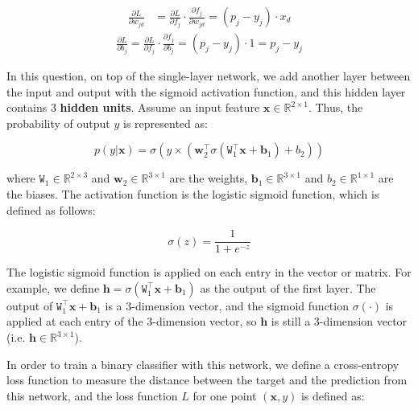 \documentclass{article}
\newcommand{\R}{\mathbb{R}}
\newcommand{\x}{\mathbf{x}}
\newcommand{\w}{\mathbf{w}}
\newcommand{\h}{\mathbf{h}}
\newcommand{\W}{\texttt{W}}
\renewcommand{\b}{\mathbf{b}}
\begin{document}
\begin{probset}
\begin{prob}
\begin{subprobset}
\begin{subprob}
            \begin{soln}
                \begin{align*}
                    \frac{\partial L}{\partial w_{jd}}
                    &= \frac{\partial L}{\partial f_j} \cdot \frac{\partial f_j}{\partial w_{jd}}
                    = (p_j - y_j) \cdot x_d
                \end{align*}
                \begin{align*}
                    \frac{\partial L}{\partial b_j}
                    = \frac{\partial L}{\partial f_j} \cdot \frac{\partial f_j}{\partial b_j}
                    = (p_j - y_j) \cdot 1
                    = p_j - y_j
                \end{align*}
            \end{soln}
        \end{subprob}
    \end{subprobset}
\end{prob}

\newpage

\begin{prob}
    In this question, on top of the single-layer network, we add another layer between the input and output with the sigmoid activation function, and this hidden layer contains 3 \textbf{hidden units}. Assume an input feature $\x \in \R^{2 \times 1}$. Thus, the probability of output $y$ is represented as:

    \[ p(y|\x) = \sigma \left( y \times (\w_2^\top \sigma(\W_1^\top \x + \b_1) + b_2) \right) \]

    where $\W_1 \in \R^{2 \times 3}$ and $\w_2 \in \R^{3 \times 1}$ are the weights, $\b_1 \in \R^{3 \times 1}$ and $b_2 \in \R^{1 \times 1}$ are the biases. The activation function is the logistic sigmoid function, which is defined as follows:

    \[ \sigma(z) = \frac{1}{1 + e^{-z}} \]

    The logistic sigmoid function is applied on each entry in the vector or matrix. For example, we define $\h = \sigma(\W_1^\top \x + \b_1)$ as the output of the first layer. The output of $\W_1^\top \x + \b_1$ is a 3-dimension vector, and the sigmoid function $\sigma(\cdot)$ is applied at each entry of the 3-dimension vector, so $\h$ is still a 3-dimension vector (i.e. $\h \in \R^{3 \times 1}$).

    In order to train a binary classifier with this network, we define a cross-entropy loss function to measure the distance between the target and the prediction from this network, and the loss function $L$ for one point $(\x, y)$ is defined as:


\end{prob}
\end{probset}
\end{document}
